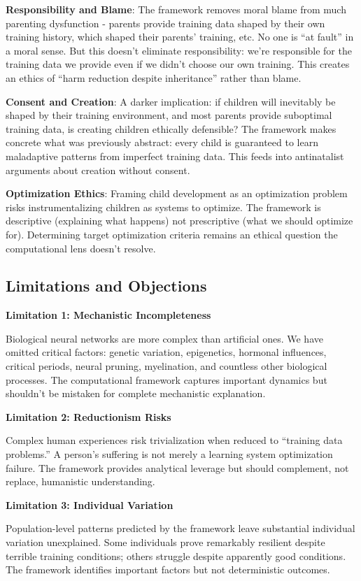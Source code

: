 \documentclass{article}
\begin{document}
\textbf{Responsibility and Blame}: The framework removes moral blame from much parenting dysfunction - parents provide training data shaped by their own training history, which shaped their parents' training, etc. No one is ``at fault'' in a moral sense. But this doesn't eliminate responsibility: we're responsible for the training data we provide even if we didn't choose our own training. This creates an ethics of ``harm reduction despite inheritance'' rather than blame.

\textbf{Consent and Creation}: A darker implication: if children will inevitably be shaped by their training environment, and most parents provide suboptimal training data, is creating children ethically defensible? The framework makes concrete what was previously abstract: every child is guaranteed to learn maladaptive patterns from imperfect training data. This feeds into antinatalist arguments about creation without consent.

\textbf{Optimization Ethics}: Framing child development as an optimization problem risks instrumentalizing children as systems to optimize. The framework is descriptive (explaining what happens) not prescriptive (what we should optimize for). Determining target optimization criteria remains an ethical question the computational lens doesn't resolve.

\subsection{Limitations and Objections}

\textbf{Limitation 1: Mechanistic Incompleteness}

Biological neural networks are more complex than artificial ones. We have omitted critical factors: genetic variation, epigenetics, hormonal influences, critical periods, neural pruning, myelination, and countless other biological processes. The computational framework captures important dynamics but shouldn't be mistaken for complete mechanistic explanation.

\textbf{Limitation 2: Reductionism Risks}

Complex human experiences risk trivialization when reduced to ``training data problems.'' A person's suffering is not merely a learning system optimization failure. The framework provides analytical leverage but should complement, not replace, humanistic understanding.

\textbf{Limitation 3: Individual Variation}

Population-level patterns predicted by the framework leave substantial individual variation unexplained. Some individuals prove remarkably resilient despite terrible training conditions; others struggle despite apparently good conditions. The framework identifies important factors but not deterministic outcomes.
\end{document}
